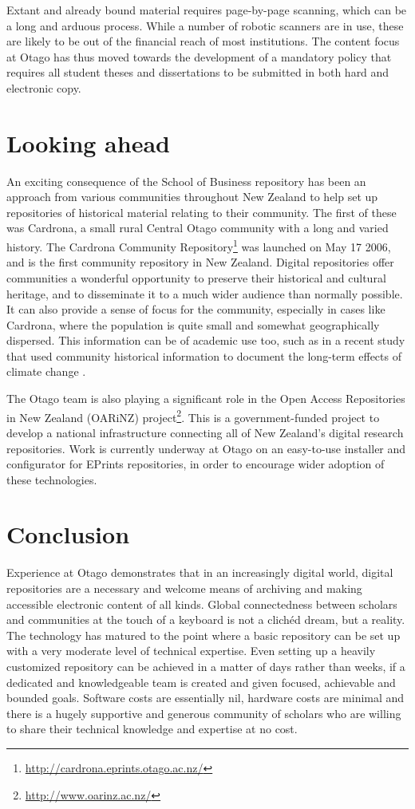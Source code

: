 \documentclass[12pt,pdftex,a4paper,titlepage]{article}
\begin{document}
Extant and already bound material requires page-by-page scanning, which can be a long and arduous process. While a number of robotic scanners are in use, these are likely to be out of the financial reach of most institutions.  The content focus at Otago has thus moved towards the development of a mandatory policy that requires all student theses and dissertations to be submitted in both hard and electronic copy.


\section{Looking ahead}

An exciting consequence of the School of Business repository has been an approach from various communities throughout New Zealand to help set up repositories of historical material relating to their community. The first of these was Cardrona, a small rural Central Otago community with a long and varied history. The Cardrona Community Repository\footnote{\url{http://cardrona.eprints.otago.ac.nz/}} was launched on May 17 2006, and is the first community repository in New Zealand. Digital repositories offer communities a wonderful opportunity to preserve their historical and cultural heritage, and to disseminate it to a much wider audience than normally possible. It can also provide a sense of focus for the community, especially in cases like Cardrona, where the population is quite small and somewhat geographically dispersed. This information can be of academic use too, such as in a recent study that used community historical information to document the long-term effects of climate change \cite{Hopk-M-2006}.

The Otago team is also playing a significant role in the Open Access Repositories in New Zealand (OARiNZ) project\footnote{\url{http://www.oarinz.ac.nz/}}. This is a government-funded project to develop a national infrastructure connecting all of New Zealand's digital research repositories. Work is currently underway at Otago on an easy-to-use installer and configurator for EPrints repositories, in order to encourage wider adoption of these technologies.


\section{Conclusion}

Experience at Otago demonstrates that in an increasingly digital world, digital repositories are a necessary and welcome means of archiving and making accessible electronic content of all kinds. Global connectedness between scholars and communities at the touch of a keyboard is not a clich\'{e}d dream, but a reality. The  technology has matured to the point where a basic repository can be set up with a very moderate level of technical expertise. Even setting up a heavily customized repository can be achieved in a matter of days rather than weeks, if a dedicated and knowledgeable team is created and given focused, achievable and bounded goals. Software costs are essentially nil, hardware costs are minimal and there is a hugely supportive and generous community of scholars who are willing to share their technical knowledge and expertise at no cost.
\end{document}
